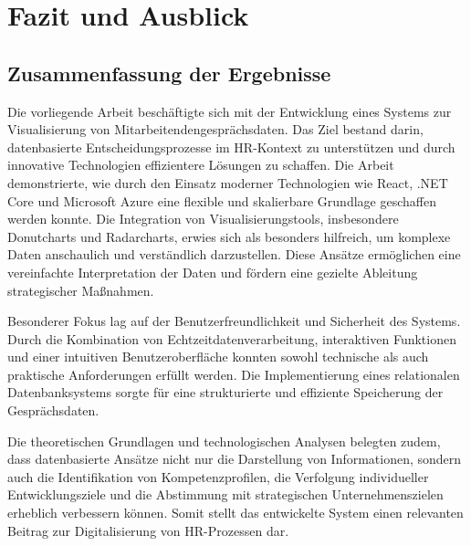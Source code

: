 \chapter{Fazit und Ausblick} \label{chap:fazit}

\section{Zusammenfassung der Ergebnisse} Die vorliegende Arbeit beschäftigte sich mit der Entwicklung eines Systems zur Visualisierung von Mitarbeitendengesprächsdaten. Das Ziel bestand darin, datenbasierte Entscheidungsprozesse im HR-Kontext zu unterstützen und durch innovative Technologien effizientere Lösungen zu schaffen. Die Arbeit demonstrierte, wie durch den Einsatz moderner Technologien wie React, .NET Core und Microsoft Azure eine flexible und skalierbare Grundlage geschaffen werden konnte. Die Integration von Visualisierungstools, insbesondere Donutcharts und Radarcharts, erwies sich als besonders hilfreich, um komplexe Daten anschaulich und verständlich darzustellen. Diese Ansätze ermöglichen eine vereinfachte Interpretation der Daten und fördern eine gezielte Ableitung strategischer Maßnahmen.

Besonderer Fokus lag auf der Benutzerfreundlichkeit und Sicherheit des Systems. Durch die Kombination von Echtzeitdatenverarbeitung, interaktiven Funktionen und einer intuitiven Benutzeroberfläche konnten sowohl technische als auch praktische Anforderungen erfüllt werden. Die Implementierung eines relationalen Datenbanksystems sorgte für eine strukturierte und effiziente Speicherung der Gesprächsdaten.

Die theoretischen Grundlagen und technologischen Analysen belegten zudem, dass datenbasierte Ansätze nicht nur die Darstellung von Informationen, sondern auch die Identifikation von Kompetenzprofilen, die Verfolgung individueller Entwicklungsziele und die Abstimmung mit strategischen Unternehmenszielen erheblich verbessern können. Somit stellt das entwickelte System einen relevanten Beitrag zur Digitalisierung von HR-Prozessen dar.


